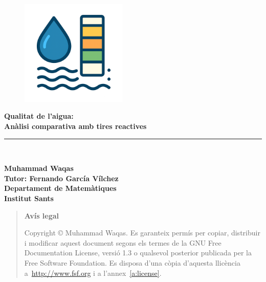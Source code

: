 \newlength{\centeroffset}
\setlength{\centeroffset}{-0.5\oddsidemargin}
\addtolength{\centeroffset}{0.5\evensidemargin}
\thispagestyle{empty}
\noindent\hspace*{\centeroffset}\begin{minipage}{\textwidth}
\begin{figure}[H]
\centering
\includegraphics[width=0.45\textwidth]{./Figures/ImatgeTR.png}
\end{figure}
\vspace*{3truecm}

\flushright
{\Huge\bfseries 
  Qualitat de l’aigua:\\
}
\vspace*{0.5truecm}
{\LARGE\bfseries
  Anàlisi comparativa amb tires reactives
}
\noindent\rule[-1ex]{\textwidth}{5pt}\\[4.5ex]
\end{minipage}

\noindent\hspace*{\centeroffset}\begin{minipage}{\textwidth}
\flushright
{\bfseries 
	Muhammad Waqas\\
	Tutor: Fernando García Vílchez \\
	Departament de Matemàtiques\\
	Institut Sants\\
}
\end{minipage}


\pagebreak

\vspace*{16truecm}

	\begin{quote}
	\textbf{Avís legal}

	  Copyright \copyright{}  Muhammad Waqas.
	  Es garanteix permís per copiar, distribuir i modificar aquest document segons els termes de la GNU Free Documentation License, versió 1.3 o qualsevol posterior publicada per la Free Software Foundation. Es disposa d'una còpia d'aquesta llicència a~\href{http://www.fsf.org}{http://www.fsf.org} i a l'annex~\ref{a:license}.
	\end{quote}	





\endinput
